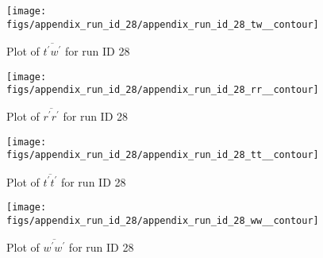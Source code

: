 \begin{figure}[H]
\centering
\texttt{[image: figs/appendix\_run\_id\_28/appendix\_run\_id\_28\_tw\_\_contour]}
\caption{Plot of $\overline{t^\prime w^\prime}$ for run ID 28}
\label{fig:appendix_run_id_28_tw__contour}
\end{figure}


\begin{figure}[H]
\centering
\texttt{[image: figs/appendix\_run\_id\_28/appendix\_run\_id\_28\_rr\_\_contour]}
\caption{Plot of $\overline{r^\prime r^\prime}$ for run ID 28}
\label{fig:appendix_run_id_28_rr__contour}
\end{figure}


\begin{figure}[H]
\centering
\texttt{[image: figs/appendix\_run\_id\_28/appendix\_run\_id\_28\_tt\_\_contour]}
\caption{Plot of $\overline{t^\prime t^\prime}$ for run ID 28}
\label{fig:appendix_run_id_28_tt__contour}
\end{figure}


\begin{figure}[H]
\centering
\texttt{[image: figs/appendix\_run\_id\_28/appendix\_run\_id\_28\_ww\_\_contour]}
\caption{Plot of $\overline{w^\prime w^\prime}$ for run ID 28}
\label{fig:appendix_run_id_28_ww__contour}
\end{figure}


